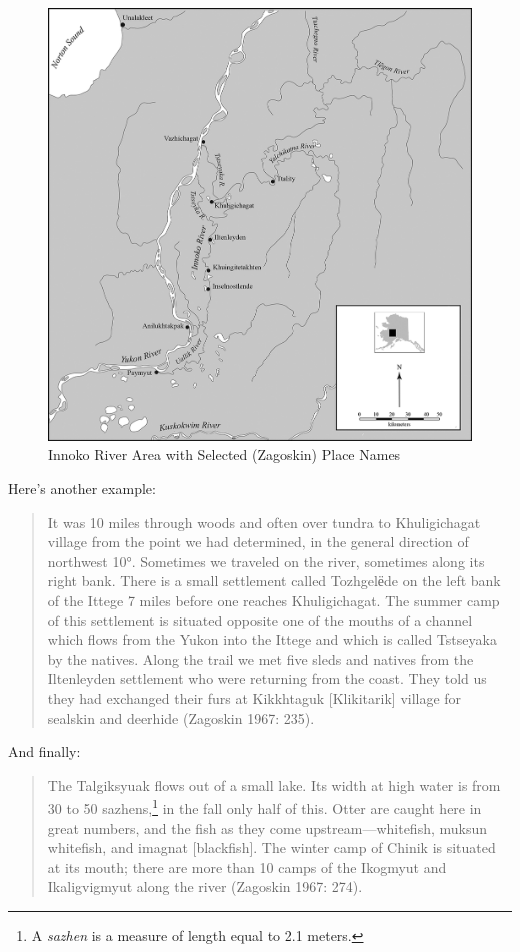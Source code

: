 \begin{figure}
    \centering
    \includegraphics[scale=0.7]{figures/pratt-fig3.png}
    \caption{Innoko River Area with Selected (Zagoskin) Place Names }
    \label{fig3}
\end{figure}


\noindent
Here’s another example:

\begin{quote}
    It was 10 miles through woods and often over tundra to Khuligichagat village from the point we had determined, in the general direction of northwest 10°. Sometimes we traveled on the river, sometimes along its right bank. There is a small settlement called Tozhgelёde on the left bank of the Ittege 7 miles before one reaches Khuligichagat. The summer camp of this settlement is situated opposite one of the mouths of a channel which flows from the Yukon into the Ittege and which is called Tstseyaka by the natives. Along the trail we met five sleds and natives from the Iltenleyden settlement who were returning from the coast. They told us they had exchanged their furs at Kikkhtaguk [Klikitarik] village for sealskin and deerhide (Zagoskin 1967: 235).
\end{quote}

\noindent
And finally:

\begin{quote}
    The Talgiksyuak flows out of a small lake. Its width at high water is from 30 to 50 sazhens,\footnote{A \textit{sazhen} is a measure of length equal to 2.1 meters. } in the fall only half of this. Otter are caught here in great numbers, and the fish as they come upstream—whitefish, muksun whitefish, and imagnat [blackfish]. The winter camp of Chinik is situated at its mouth; there are more than 10 camps of the Ikogmyut and Ikaligvigmyut along the river (Zagoskin 1967: 274).
\end{quote}

